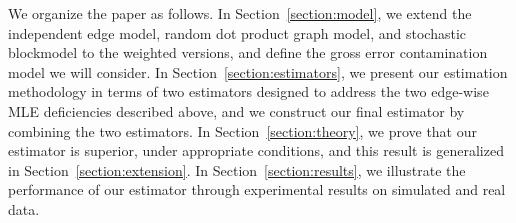 \documentclass[a4paper]{article}
\begin{document}
We organize the paper as follows. In Section~\ref{section:model}, we extend the independent edge model, random dot product graph model, and stochastic blockmodel to the weighted versions, and define the gross error contamination model we will consider. In Section~\ref{section:estimators}, we present our estimation methodology in terms of two estimators
designed to address the two edge-wise MLE deficiencies described above, and we construct our final estimator by combining the two estimators. In Section~\ref{section:theory}, we prove that our estimator is superior, under appropriate conditions, and this result is generalized in Section~\ref{section:extension}. In Section~\ref{section:results}, we illustrate the performance of our estimator through experimental results on simulated and real data.
\end{document}
